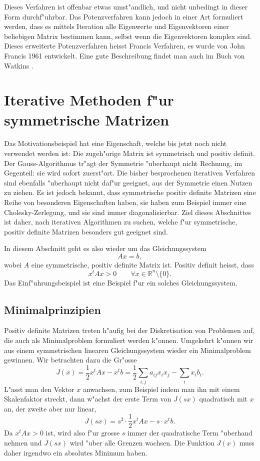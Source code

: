Dieses Verfahren ist offenbar etwas umst"andlich, und nicht unbedingt
in dieser Form durchf"uhrbar.
Das Potenzverfahren kann jedoch in einer Art formuliert werden, dass
es mittels Iteration alle Eigenwerte und Eigenvektoren einer beliebigen
Matrix bestimmen kann, selbst wenn die Eigenvektoren komplex sind.
Dieses erweiterte Potenzverfahren heisst Francis Verfahren, es
wurde von John Francis 1961 entwickelt.
Eine gute Beschreibung findet man auch im Buch von Watkins
\cite[Chapter 5]{skript:watkins}.

\section{Iterative Methoden f"ur symmetrische Matrizen}
Das Motivationsbeispiel hat eine Eigenschaft, welche bis jetzt noch
nicht verwendet werden ist:
Die zugeh"orige Matrix ist symmetrisch und positiv definit.
Der Gauss-Algorithmus tr"agt der Symmetrie "uberhaupt nicht Rechnung,
im Gegenteil: sie wird sofort zuerst"ort.
Die bisher besprochenen iterativen Verfahren sind ebenfalls "uberhaupt
nicht daf"ur geeignet, aus der Symmetrie einen Nutzen zu ziehen.
Es ist jedoch bekannt, dass symmetrische positiv definite Matrizen
eine Reihe von besonderen Eigenschaften haben, sie haben zum Beispiel
immer eine Cholesky-Zerlegung, und sie sind immer diagonalisierbar.
Ziel dieses Abschnittes ist daher, nach iterativen Algorithmen zu
suchen, welche f"ur symmetrische, positiv definite Matrizen besonders
gut geeignet sind.

In diesem Abschnitt geht es also wieder um das Gleichungssystem
\[
Ax=b,
\]
wobei $A$ eine symmetrische, positiv definite Matrix ist.
Positiv definit heisst, dass 
\[
x^tAx > 0\qquad \forall x\in\mathbb R^n\setminus\{0\}.
\]
Das Einf"uhrungsbeispiel ist eine Beispiel f"ur ein solches Gleichungssystem.

\subsection{Minimalprinzipien}
Positiv definite Matrizen treten h"aufig bei der Diskretisation von 
Problemen auf, die auch als Minimalproblem formuliert werden k"onnen.
Umgekehrt k"onnen wir aus einem symmetrischen linearen Gleichungssystem
wieder ein Minimalproblem gewinnen.
Wir betrachten dazu die Gr"osse
\[
J(x)=\frac12x^tAx-x^tb =
\frac12\sum_{i,j}a_{ij}x_ix_j-\sum_ix_ib_i.
\]
L"asst man den Vektor $x$ anwachsen, zum Beispiel indem man ihn mit
einem Skalenfaktor streckt, dann w"achst der erste Term von $J(sx)$
quadratisch mit $x$ an, der zweite aber nur linear,
\[
J(sx)=s^2\cdot\frac12x^tAx - s\cdot x^tb.
\]
Da $x^tAx >0$ ist, wird also f"ur grosse $s$ immer der quadratische
Term "uberhand nehmen und $J(sx)$ wird "uber alle Grenzen wachsen.
Die Funktion $J(x)$ muss daher irgendwo ein absolutes Minimum
haben.

